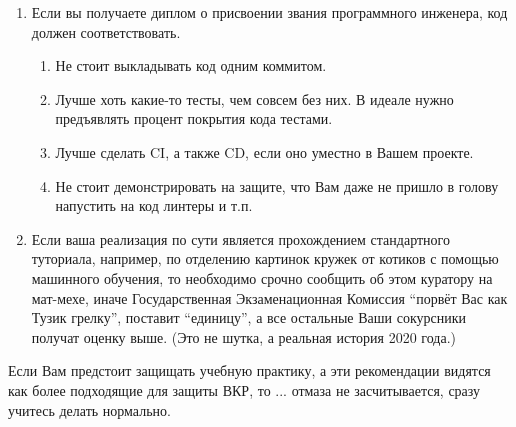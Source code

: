 \begin{enumerate}
\begin{itemize}
        \end{itemize}
  \item Если вы получаете диплом о присвоении звания программного инженера, код должен соответствовать.
        \begin{enumerate}
          \item Не стоит выкладывать код одним коммитом.
          \item Лучше хоть какие-то тесты, чем совсем без них. В идеале нужно предъявлять процент покрытия кода тестами.
          \item Лучше  сделать \textsc{CI}, а также \textsc{CD}, если оно уместно в Вашем проекте.
          \item Не стоит демонстрировать на защите, что Вам даже не пришло в голову напустить на код линтеры и т.п.
        \end{enumerate}
  \item Если ваша реализация по сути является прохождением стандартного туториала, например, по отделению картинок кружек от котиков с помощью машинного обучения, то необходимо срочно сообщить об этом куратору на мат-мехе, иначе Государственная Экзаменацион\-ная Комиссия ``порвёт Вас как Тузик грелку'', поставит ``единицу'', а все остальные Ваши сокурсники получат оценку выше. (Это не шутка, а реальная история 2020 года.)
\end{enumerate}

\noindent Если Вам предстоит защищать учебную практику, а эти рекомендации видятся как более подходящие для защиты ВКР, то ... отмаза не засчиты\-вается, сразу учитесь делать нормально.
